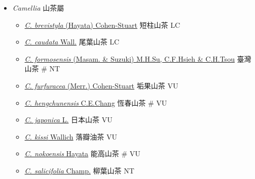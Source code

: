 
  \begin{itemize}
 \item[] \textit{Camellia} 山茶屬
                                
  \begin{itemize}
        \item[] \href{http://www.theplantlist.org/tpl1.1/search?q=Camellia+brevistyla}{\textit{C. brevistyla} (Hayata) Cohen-Stuart}   短柱山茶   LC
        \item[] \href{http://www.theplantlist.org/tpl1.1/search?q=Camellia+caudata}{\textit{C. caudata} Wall.}   尾葉山茶   LC
        \item[] \href{http://www.theplantlist.org/tpl1.1/search?q=Camellia+formosensis}{\textit{C. formosensis} (Masam. \& Suzuki) M.H.Su, C.F.Hsieh \& C.H.Tsou}   臺灣山茶  \# NT
        \item[] \href{http://www.theplantlist.org/tpl1.1/search?q=Camellia+furfuracea}{\textit{C. furfuracea} (Merr.) Cohen-Stuart}   垢果山茶   VU
        \item[] \href{http://www.theplantlist.org/tpl1.1/search?q=Camellia+hengchunensis}{\textit{C. hengchunensis} C.E.Chang}   恆春山茶  \# VU
        \item[] \href{http://www.theplantlist.org/tpl1.1/search?q=Camellia+japonica}{\textit{C. japonica} L.}   日本山茶   VU
        \item[] \href{http://www.theplantlist.org/tpl1.1/search?q=Camellia+kissi}{\textit{C. kissi} Wallich}   落瓣油茶   VU
        \item[] \href{http://www.theplantlist.org/tpl1.1/search?q=Camellia+nokoensis}{\textit{C. nokoensis} Hayata}   能高山茶  \# VU
        \item[] \href{http://www.theplantlist.org/tpl1.1/search?q=Camellia+salicifolia}{\textit{C. salicifolia} Champ.}   柳葉山茶   NT

\end{itemize}
\end{itemize}
